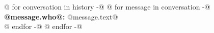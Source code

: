 \documentclass[a4paper]{article}
\begin{document}
@{ for conversation in history -}@
@{ for message in conversation -}@
\textbf{@{{message.who}}@:} @{{message.text}}@ \\
@{ endfor -}@
@{ endfor -}@
\end{document}
